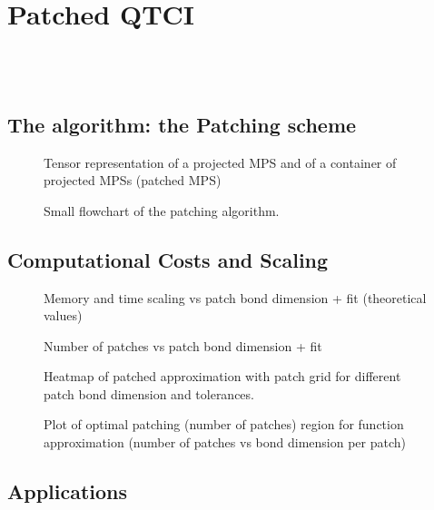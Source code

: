 \chapter{Patched QTCI}
\label{chap:patching}

\\

\noindent {}\\ 

\section{The algorithm: the Patching scheme}

\begin{figure}[h!]
	\caption{Tensor representation of a projected MPS and of a container of projected MPSs (patched MPS)}
\end{figure}

\begin{figure}[h!]
	\caption{Small flowchart of the patching algorithm.}
\end{figure}
\section{Computational Costs and Scaling}

\begin{figure}[h!]
	\caption{Memory and time scaling vs patch bond dimension + fit (theoretical values)}
\end{figure}

\begin{figure}[h!]
	\caption{Number of patches vs patch bond dimension + fit }
\end{figure}

\begin{figure}[h!]
	\caption{Heatmap of patched approximation with patch grid for different patch bond dimension and tolerances.}
\end{figure}

\begin{figure}[h!]
	\caption{Plot of optimal patching (number of patches) region for function approximation (number of patches vs bond dimension per patch)}
\end{figure}



\section{Applications}

